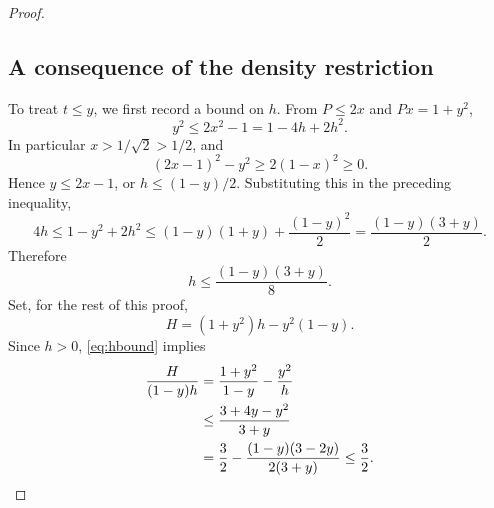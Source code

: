 \documentclass[11pt]{article}
\numberwithin{equation}{section}
\theoremstyle{remark}
\begin{document}
\begin{proof}
\subsection*{A consequence of the density restriction}
To treat $t\le y$, we first record a bound on $h$. From $P\le2x$ and $Px=1+y^2$,
\[
 y^2\le2x^2-1=1-4h+2h^2.
\]
In particular $x>1/\sqrt2>1/2$, and
\[
 (2x-1)^2-y^2\ge2(1-x)^2\ge0.
\]
Hence $y\le2x-1$, or $h\le(1-y)/2$. Substituting this in the preceding inequality,
\[
 4h\le1-y^2+2h^2
 \le(1-y)(1+y)+\frac{(1-y)^2}{2}
 =\frac{(1-y)(3+y)}2.
\]
Therefore
\begin{equation}\label{eq:hbound}
 h\le\frac{(1-y)(3+y)}8.
\end{equation}
Set, for the rest of this proof,
\[
 H=(1+y^2)h-y^2(1-y).
\]
Since $h>0$, \eqref{eq:hbound} implies
\begin{align}\label{eq:Hbound}
 \frac{H}{(1-y)h}
 &=\frac{1+y^2}{1-y}-\frac{y^2}{h}\notag\\
 &\le\frac{3+4y-y^2}{3+y}\notag\\
 &=\frac32-\frac{(1-y)(3-2y)}{2(3+y)}\le\frac32.
\end{align}


\end{proof}
\end{document}
